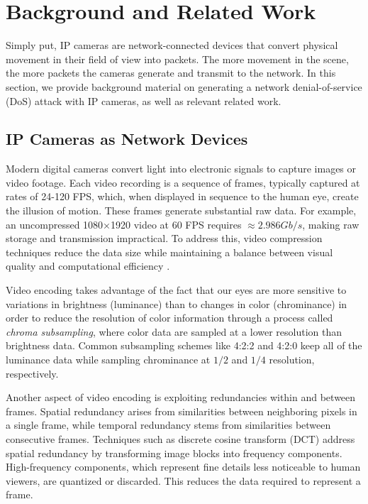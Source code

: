 \section{Background and Related Work}
\label{sec:background}

Simply put, IP cameras are network-connected devices that convert physical movement in their field of view into packets. 
The more movement in the scene, the more packets the cameras generate and transmit to the network. In this section, we provide background material on generating a network denial-of-service (DoS) attack with IP cameras, as well as relevant related work.

\subsection{IP Cameras as Network Devices}
\label{sec:compression}
Modern digital cameras convert light into electronic signals to capture images or video footage. Each video recording is a sequence of frames, typically captured at rates of 24-120 FPS, which, when displayed in sequence to the human eye, create the illusion of motion. These frames generate substantial raw data. For example, an uncompressed 1080×1920 video at 60 FPS requires $\approx 2.986Gb/s$, making raw storage and transmission impractical. To address this, video compression techniques reduce the data size while maintaining a balance between visual quality and computational efficiency \cite{Mitrovic_VideoCompression, jack2011video, nassi2018gamedronesdetecting}.

Video encoding takes advantage of the fact that our eyes are more sensitive to variations in brightness (luminance) than to changes in color (chrominance) in order to reduce the resolution of color information through a process called \textit{chroma subsampling}, where color data are sampled at a lower resolution than brightness data. Common subsampling schemes like 4:2:2 and 4:2:0 keep all of the luminance data while sampling chrominance at $1/2$ and $1/4$ resolution, respectively.

Another aspect of video encoding is exploiting redundancies within and between frames. Spatial redundancy arises from similarities between neighboring pixels in a single frame, while temporal redundancy stems from similarities between consecutive frames. Techniques such as discrete cosine transform (DCT) address spatial redundancy by transforming image blocks into frequency components. High-frequency components, which represent fine details less noticeable to human viewers, are quantized or discarded. This reduces the data required to represent a frame.

